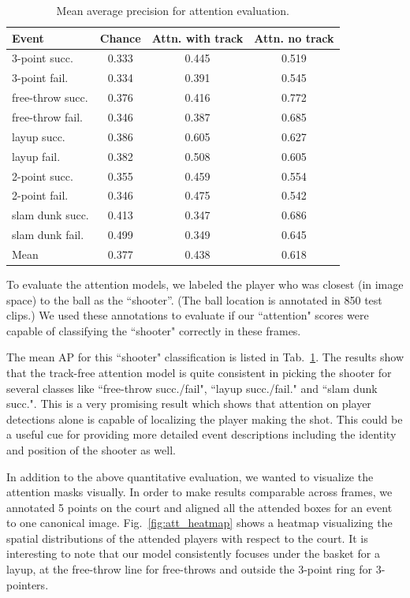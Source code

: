 \begin{table}[ht!]
\begin{center}
\small
 \begin{tabular}{|l|c|c|c|}
  \hline
Event            & Chance & Attn. with track & Attn. no track \\ \hline \hline
3-point succ.    & 0.333 & 0.445 & 0.519 \\ 
3-point fail.    & 0.334 & 0.391 & 0.545 \\ 
free-throw succ. & 0.376 & 0.416 & 0.772 \\ 
free-throw fail. & 0.346 & 0.387 & 0.685 \\  
layup succ.      & 0.386 & 0.605 & 0.627 \\ 
layup fail.      & 0.382 & 0.508 & 0.605 \\ 
2-point succ.    & 0.355 & 0.459 & 0.554 \\ 
2-point fail.    & 0.346 & 0.475 & 0.542 \\ 
slam dunk succ.  & 0.413 & 0.347 & 0.686 \\ 
slam dunk fail.  & 0.499 & 0.349 & 0.645 \\ \hline \hline  
Mean             & 0.377 & 0.438 & 0.618 \\ \hline
  \end{tabular}
\end{center}
  \caption{Mean average precision for attention evaluation.}
  \label{tab:attention_res}
\end{table}

To evaluate the attention models, we  labeled the player who was
closest (in image space) to the ball as the ``shooter''.
(The ball location is annotated in 850 test clips.)
We used these annotations to evaluate if our ``attention" scores
were capable of classifying the ``shooter" correctly in these frames.


The mean AP for this ``shooter"  classification is listed
in Tab.~\ref{tab:attention_res}.
The results show that the track-free attention model is quite consistent in picking
the shooter for several classes like ``free-throw succ./fail",
``layup succ./fail." and ``slam dunk succ.". This is a very
promising result which shows that attention on player detections
alone is capable of localizing the player making the shot. This could be
a useful cue for providing more detailed event descriptions
including the identity and position of the shooter as well.

In addition to the above quantitative evaluation, we wanted to
visualize the attention masks visually.
In order to make results comparable across frames, 
we annotated 5 points on the court and
aligned all the attended boxes for an event to one canonical image. 
Fig.~\ref{fig:att_heatmap} shows a heatmap  visualizing the spatial distributions
of the attended players with respect to the court. It is interesting to note that
our model consistently focuses under the basket for a layup, at the free-throw
line for free-throws and outside the 3-point ring for 3-pointers.

